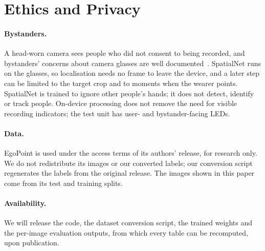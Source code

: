 \section{Ethics and Privacy}\label{sec:ethics}

\paragraph{Bystanders.} A head-worn camera sees people who did not consent to being recorded, and bystanders' concerns about camera glasses are well documented~\cite{denning2014situ,hoyle2014privacy}. SpatialNet runs on the glasses, so localisation needs no frame to leave the device, and a later step can be limited to the target crop and to moments when the wearer points. SpatialNet is trained to ignore other people's hands; it does not detect, identify or track people. On-device processing does not remove the need for visible recording indicators; the test unit has user- and bystander-facing LEDs.

\paragraph{Data.} EgoPoint is used under the access terms of its authors' release, for research only. We do not redistribute its images or our converted labels; our conversion script regenerates the labels from the original release. The images shown in this paper come from its test and training splits. 

\paragraph{Availability.} We will release the code, the dataset conversion script, the trained weights and the per-image evaluation outputs, from which every table can be recomputed, upon publication.

